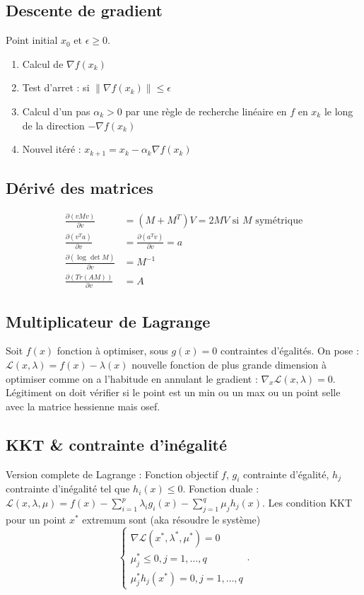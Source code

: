 \documentclass{article}
\theoremstyle{plain}%
\theoremstyle{definition}
\theoremstyle{remark}
\begin{document}
\subsection{Descente de gradient}
Point initial $ x_0 $ et $ \epsilon \geq 0 $.
\begin{enumerate}
    \item Calcul de $ \nabla f(x_k) $ 
    \item Test d'arret : si $ \left\| \nabla f(x_k) \right\| \leq \epsilon  $ 
    \item Calcul d'un pas $ \alpha _k > 0 $ par une règle de recherche linéaire en $ f $ en $ x_k $ le long de la direction $ - \nabla f(x_k) $ 
    \item Nouvel itéré : $ x_{k+1} = x_k - \alpha _k \nabla f(x_k) $ 
\end{enumerate}

\subsection{Dérivé des matrices}
\begin{align*}
    \frac{\partial (vMv)}{\partial v} &= (M + M^T)V = 2MV \text{ si } M \text{ symétrique} \\
    \frac{\partial (v^T a)}{\partial v} &= \frac{\partial (a^T v)}{\partial v} = a \\
    \frac{\partial (\log_{} \det M)}{\partial v} &= M^{-1}\\
    \frac{\partial (Tr(AM))}{\partial v} &= A
\end{align*}

\subsection{Multiplicateur de Lagrange}
Soit $ f(x) $ fonction à optimiser, sous $ g(x) = 0 $ contraintes d'égalités. On pose : $ \mathcal{L}(x,\lambda) = f(x) - \lambda  (x)$ nouvelle fonction de plus grande dimension à optimiser comme on a l'habitude en annulant le gradient : $ \nabla _x \mathcal{L}(x,\lambda ) = 0 $. Légitiment on doit vérifier si le point est un min ou un max ou un point selle avec la matrice hessienne mais osef.

\subsection{KKT \& contrainte d'inégalité}
Version complete de Lagrange : Fonction objectif $ f $, $ g_i $ contrainte d'égalité, $ h_j $ contrainte d'inégalité tel que $ h_i(x) \leq 0 $. Fonction duale : $ \mathcal{L} (x, \lambda , \mu) = f(x) - \sum_{i=1}^{p} \lambda _i g_i(x) - \sum_{j=1}^{q} \mu _j h_j(x)$. Les condition KKT pour un point $ x^* $ extremum sont (aka résoudre le système)
\[
    \begin{cases}
    \nabla \mathcal{L}(x^*, \lambda^* , \mu^* ) = 0 \\
    \mu ^*_j \leq 0, j = 1, \dots, q \\
    \mu ^*_j h_j(x^*) = 0, j =1, \dots, q
    \end{cases} 
.\]
\end{document}
